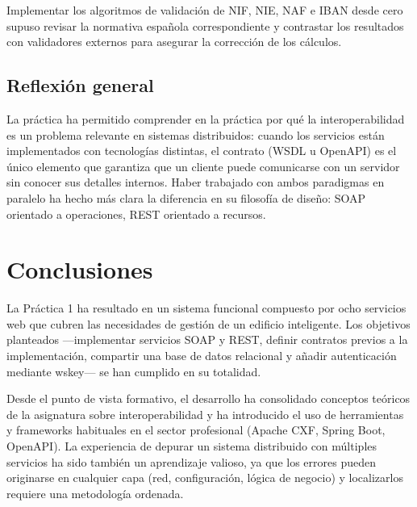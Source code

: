 \documentclass[12pt, a4paper]{article}
\begin{document}
Implementar los algoritmos de validación de NIF, NIE, NAF e IBAN desde cero supuso revisar la normativa española correspondiente y contrastar los resultados con validadores externos para asegurar la corrección de los cálculos.

\subsection{Reflexión general}

La práctica ha permitido comprender en la práctica por qué la interoperabilidad es un problema relevante en sistemas distribuidos: cuando los servicios están implementados con tecnologías distintas, el contrato (WSDL u OpenAPI) es el único elemento que garantiza que un cliente puede comunicarse con un servidor sin conocer sus detalles internos. Haber trabajado con ambos paradigmas en paralelo ha hecho más clara la diferencia en su filosofía de diseño: SOAP orientado a operaciones, REST orientado a recursos.

\section{Conclusiones}

La Práctica 1 ha resultado en un sistema funcional compuesto por ocho servicios web que cubren las necesidades de gestión de un edificio inteligente. Los objetivos planteados ---implementar servicios SOAP y REST, definir contratos previos a la implementación, compartir una base de datos relacional y añadir autenticación mediante wskey--- se han cumplido en su totalidad.

Desde el punto de vista formativo, el desarrollo ha consolidado conceptos teóricos de la asignatura sobre interoperabilidad y ha introducido el uso de herramientas y frameworks habituales en el sector profesional (Apache CXF, Spring Boot, OpenAPI). La experiencia de depurar un sistema distribuido con múltiples servicios ha sido también un aprendizaje valioso, ya que los errores pueden originarse en cualquier capa (red, configuración, lógica de negocio) y localizarlos requiere una metodología ordenada.
\end{document}
